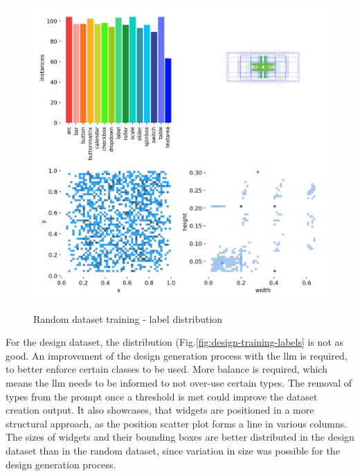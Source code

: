 \documentclass[Bachelor, BIC, english, fhCitStyle, IEEE]{BASE/twbook} %
\begin{document}
\begin{figure}[H]
    \caption{Random dataset training - label distribution}
    \centering
    \includegraphics[width=\textwidth]{PICs/train371/labels.jpg}
    \label{fig:random-training-labels}
\end{figure}
\noindent
For the design dataset, the distribution (Fig.\ref{fig:design-training-labels} is not as good. An improvement of the design generation process with the \ac{llm} is required, to better enforce certain classes to be used. More balance is required, which means the \ac{llm} needs to be informed to not over-use certain types. The removal of types from the prompt once a threshold is met could improve the dataset creation output. It also showcases, that widgets are positioned in a more structural approach, as the position scatter plot forms a line in various columns. The sizes of widgets and their bounding boxes are better distributed in the design dataset than in the random dataset, since variation in size was possible for the design generation process.
\end{document}
